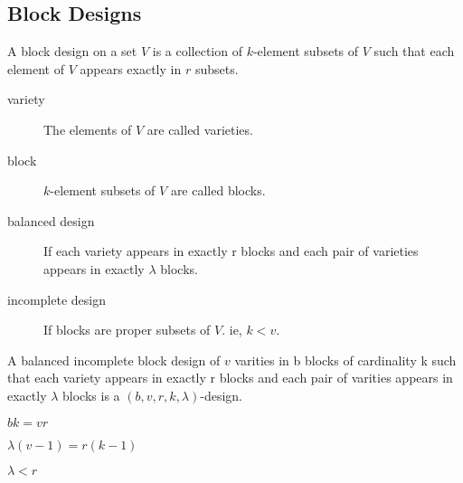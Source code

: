 
\subsection{Block Designs}
\begin{definition}
	A block design on a set $V$ is a collection of $k$-element subsets of $V$ such that each element of $V$ appears exactly in $r$ subsets.
\end{definition}

\begin{description}
	\item[variety] The elements of $V$ are called varieties.
	\item[block] $k$-element subsets of $V$ are called blocks.
	\item[balanced design] If each variety appears in exactly r blocks and each pair of varieties appears in exactly $\lambda$ blocks.
	\item[incomplete design] If blocks are proper subsets of $V$. ie, $k < v$.
\end{description}

\begin{definition}
	A balanced incomplete block design of $v$ varities in b blocks of cardinality k such that each variety appears in exactly r blocks and each pair of varities appears in exactly $\lambda$ blocks is a $(b,v,r,k,\lambda)$-design.
\end{definition}

\begin{theorem}
	$bk = vr$
\end{theorem}

\begin{theorem}
	$\lambda(v-1) = r(k-1)$
\end{theorem}
\begin{corollary}
	$\lambda < r$
\end{corollary}

